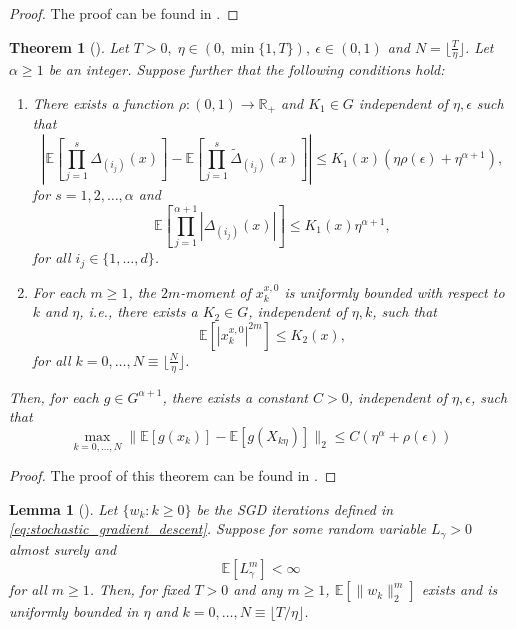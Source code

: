 \documentclass[12pt]{article}
\newtheorem{theorem}{Theorem}[section]
\newtheorem{lemma}[lemma]{Lemma}
\theoremstyle{definition}
\numberwithin{equation}{section}
\newcommand{\R}{\mathbb{R}}
\newcommand{\ev}[1]{\mathbb{E}\left[{#1}\right]}
\newcommand{\norm}[1]{\lVert{#1}\rVert_2}
\begin{document}
\begin{proof}
  The proof can be found in \cite{liStochasticModifiedEquations2019}.
\end{proof}
\begin{theorem}[]
  \label{thm:approximation}
  Let $T > 0, \; \eta \in (0,\min\{1,T\}), \: \epsilon \in (0,1)$ and $N = \lfloor \frac{T}{\eta} \rfloor$. Let $\alpha \geq 1$ be an integer. Suppose further that the following conditions hold:
  \begin{enumerate}[label=(\roman*)]
    \item There exists a function $\rho : (0,1) \rightarrow \R_+$ and $K_1 \in G$ independent of $\eta, \epsilon$ such that
    \begin{equation*}
      \left\lvert \ev{\prod_{j=1}^s \Delta_{(i_j)}(x)} - \ev{\prod_{j=1}^s \tilde{\Delta}_{(i_j)}(x)}\right\rvert \leq K_1(x)(\eta \rho(\epsilon) + \eta^{\alpha+1}),
    \end{equation*}
    for $s=1,2,\dots,\alpha$ and
    \begin{equation*}
      \ev{\prod_{j=1}^{\alpha+1}\left\lvert \Delta_{(i_j)}(x)\right\rvert} \leq K_1(x)\eta^{\alpha+1},
    \end{equation*}
    for all $i_j \in \{1,\dots,d\}$.
    \item For each $m \geq 1$, the $2m$-moment of $x_k^{x,0}$ is uniformly bounded with respect to $k$ and $\eta$, i.e., there exists a $K_2 \in G$, independent of $\eta, k$, such that
    \begin{equation*}
      \ev{\left\lvert x_k^{x,0} \right\rvert^{2m}} \leq K_2(x),
    \end{equation*}
    for all $k = 0, \dots, N \equiv \lfloor \frac{N}{\eta} \rfloor$.
  \end{enumerate}
  Then, for each $g \in G^{\alpha + 1}$, there exists a constant $C > 0$, independent of $\eta, \epsilon$, such that
  \begin{equation*}
    \max_{k=0,\dots,N}\norm{\ev{g(x_k)} - \ev{g(X_{k\eta})}} \leq C(\eta^{\alpha} + \rho(\epsilon))
  \end{equation*}
\end{theorem}
\begin{proof}
  The proof of this theorem can be found in \cite{liStochasticModifiedEquations2019}.
\end{proof}
\begin{lemma}[]
  \label{lemma:moment_bound}
  Let $\{w_k: k \geq 0 \}$ be the SGD iterations defined in \eqref{eq:stochastic_gradient_descent}. Suppose for some random variable $L_{\gamma} > 0$ almost surely and 
  \begin{equation*}
    \ev{L_{\gamma}^m} < \infty
  \end{equation*}
  for all $m \geq 1$. Then, for fixed $T > 0$ and any $m \geq 1$, $\ev{\norm{w_k}^m}$ exists and is uniformly bounded in $\eta$ and $k=0,\dots,N\equiv \lfloor T / \eta \rfloor$.
\end{lemma}
\end{document}
